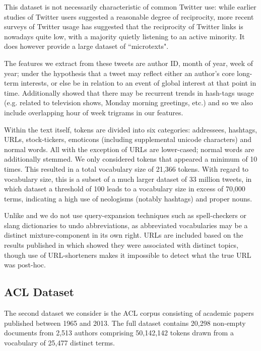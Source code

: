 This dataset is not necessarily characteristic of common Twitter use: while earlier studies of Twitter users suggested a reasonable degree of reciprocity\cite{Java2007}, more recent surveys of Twitter usage has suggested that the reciprocity of Twitter links is nowadays quite low, with a majority quietly listening to an active minority\cite{Kwak2010}. It does however provide a large dataset of ``microtexts".

The features we extract from these tweets are author ID, month of year, week of year; under the hypothesis that a tweet may reflect either an author's core long-term interests, or else be in relation to an event of global interest at that point in time. Additionally \cite{Preot2012} showed that there may be recurrent trends in hash-tags usage (e.g. related to television shows, Monday morning greetings, etc.) and so we also include overlapping hour of week trigrams in our features. 


Within the text itself, tokens are divided into six categories: addressees, hashtags, URLs, stock-tickers, emoticons (including supplemental unicode characters) and normal words. All with the exception of URLs are lower-cased; normal words are additionally stemmed. We only considered tokens that appeared a minimum of 10 times. This resulted in a total vocabulary size of 21,366 tokens. With regard to vocabulary size, this is a subset of a much larger dataset of 33 million tweets, in which dataset a threshold of 100 leads to a vocabulary size in excess of 70,000 terms, indicating a high use of neologisms (notably hashtags) and proper nouns.

Unlike \cite{Wu2010} and \cite{Han2011} we do not use query-expansion techniques such as spell-checkers or slang dictionaries to undo abbreviations, as abbreviated vocabularies may be a distinct mixture-component in its own right. URLs are included based on the results published in \cite{Michelson2010} which showed they were associated with distinct topics, though use of URL-shorteners makes it impossible to detect what the true URL was post-hoc.

\subsection*{ACL Dataset}
The second dataset we consider is the ACL corpus consisting of academic papers published between 1965 and 2013. The full dataset contains 20,298 non-empty documents from 2,513 authors comprising 50,142,142 tokens drawn from a vocabulary of 25,477 distinct terms. 

